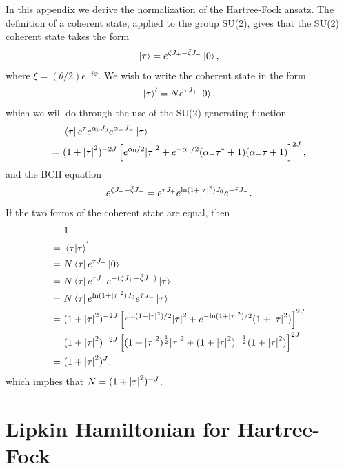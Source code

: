 \documentclass[10pt]{article}
\begin{document}
\begin{appendices}
In this appendix we derive the normalization of the Hartree-Fock ansatz.
The definition of a coherent state, applied to the group SU(2), gives that the SU(2) coherent state takes the form
\begin{align}
\ket{\tau}=e^{\zeta J_+-\bar{\zeta}J_-}\ket{0},
\end{align}
where $\xi=(\theta/2)e^{-i\phi}$. We wish to write the coherent state in the form
\begin{align}
\ket{\tau}'=Ne^{\tau J_+}\ket{0},
\end{align}
which we will do through the use of the SU(2) generating function
\begin{align}
\label{gf}
&\bra{\tau}e^{\tau}e^{\alpha_0J_0}e^{\alpha_-J_-}\ket{\tau}
\\
= \ &
(1+\abs{\tau}^2)^{-2J}\left[e^{\alpha_0/2}\abs{\tau}^2+e^{-\alpha_0/2}(\alpha_+\tau^*+1)(\alpha_-\tau+1)\right]^{2J},
\end{align}
and the BCH equation
\begin{align}
e^{\zeta J_+-\bar{\zeta}J_-}
=
e^{\tau J_+}e^{\text{ln}(1+\abs{\tau}^2)J_0}e^{-\bar{\tau}J_-}.
\end{align}
If the two forms of the coherent state are equal, then
\begin{align}
&1
\\
= \ &\bra{\tau}\ket{\tau}^{'}
\\
= \ &
N\bra{\tau}e^{\tau J_+}\ket{0}
\\
= \ &
N\bra{\tau}e^{\tau J_+}e^{-(\zeta J_+-\bar{\zeta}J_-)}\ket{\tau}
\\
= \ &
N\bra{\tau}e^{\text{ln}(1+\abs{\tau}^2)J_0}e^{\bar{\tau}J_-}\ket{\tau}
\\
= \ &
(1+\abs{\tau}^2)^{-2J}\left[e^{\text{ln}(1+\abs{\tau}^2)/2}\abs{\tau}^2+e^{-\text{ln}(1+\abs{\tau}^2)/2}(1+\abs{\tau}^2)\right]^{2J}
\\
= \ &
(1+\abs{\tau}^2)^{-2J}\left[(1+\abs{\tau}^2)^{\frac{1}{2}}\abs{\tau}^2+(1+\abs{\tau}^2)^{-\frac{1}{2}}(1+\abs{\tau}^2)\right]^{2J}
\\
= \ &
(1+\abs{\tau}^2)^J,
\end{align}
which implies that $N=(1+\abs{\tau}^2)^{-J}$.

\chapter{Lipkin Hamiltonian for Hartree-Fock}
\label{appendix:lipkin_hamiltonian_matrix_elements_for_hf}


\end{appendices}
\end{document}
